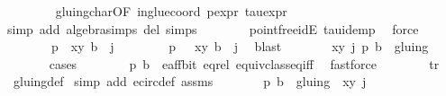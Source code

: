 \begin{isabellebody}
\ \ \ \ \ \ \isamarkupfalse%
\ gluing{\isacharunderscore}char{\isacharbrackleft}OF\ in{\isacharunderscore}glue{\isacharunderscore}coord{\isacharbrackright}\ p{\isacharunderscore}expr\ tau{\isacharunderscore}expr\ \isanewline
\ \ \ \ \ \ \isamarkupfalse%
{\isacharparenleft}simp\ add{\isacharcolon}\ algebra{\isacharunderscore}simps\ del{\isacharcolon}\ {\isasymtau}{\isachardot}simps{\isacharparenright}\isanewline
\ \ \ \ \ \ \isamarkupfalse%
\ pointfree{\isacharunderscore}idE\ tau{\isacharunderscore}idemp\ \isamarkupfalse%
\ force\isanewline
\ \ \ \ \isamarkupfalse%
\ \isamarkupfalse%
\isanewline
\ \ \ \ \ \ {\isacharparenleft}{}{\isacharparenright}\ {\isachardoublequoteopen}p\ {\isacharequal}\ {\isacharparenleft}x{\isacharcomma}y{\isacharparenright}{\isachardoublequoteclose}\ {\isachardoublequoteopen}b\ {\isacharequal}\ j{\isachardoublequoteclose}\ {\isacharbar}\isanewline
\ \ \ \ \ \ {\isacharparenleft}{}{\isacharparenright}\ {\isachardoublequoteopen}p\ {\isacharequal}\ {\isasymtau}\ {\isacharparenleft}x{\isacharcomma}y{\isacharparenright}{\isachardoublequoteclose}\ {\isachardoublequoteopen}b\ {\isacharequal}\ j{\isacharplus}{}{\isachardoublequoteclose}\ \isamarkupfalse%
\ blast\isanewline
\ \ \ \ \isamarkupfalse%
\ \isamarkupfalse%
\ {\isachardoublequoteopen}{\isacharparenleft}{\isacharparenleft}{\isacharparenleft}x{\isacharcomma}y{\isacharparenright}{\isacharcomma}\ j{\isacharparenright}{\isacharcomma}\ p{\isacharcomma}\ b{\isacharparenright}\ {\isasymin}\ gluing{\isachardoublequoteclose}\ \isanewline
\ \ \ \ \ \ \isamarkupfalse%
{\isacharparenleft}cases{\isacharparenright}\isanewline
\ \ \ \ \ \ \isamarkupfalse%
\ {\isacartoucheopen}{\isacharparenleft}p{\isacharcomma}\ b{\isacharparenright}\ {\isasymin}\ e{\isacharunderscore}aff{\isacharunderscore}bit{\isacartoucheclose}\ eq{\isacharunderscore}rel\ equiv{\isacharunderscore}class{\isacharunderscore}eq{\isacharunderscore}iff\ \isamarkupfalse%
\ fastforce\isanewline
\ \ \ \ \ \ \isamarkupfalse%
\ tr\ \isamarkupfalse%
\ gluing{\isacharunderscore}def\ \isamarkupfalse%
{\isacharparenleft}simp\ add{\isacharcolon}\ e{\isacharunderscore}circ{\isacharunderscore}def\ assms{\isacharparenright}\isanewline
\ \ \ \ \isamarkupfalse%
\ \isamarkupfalse%
\ {\isachardoublequoteopen}{\isacharparenleft}p{\isacharcomma}\ b{\isacharparenright}\ {\isasymin}\ gluing\ {\isacharbackquote}{\isacharbackquote}\ {\isacharbraceleft}{\isacharparenleft}{\isacharparenleft}x{\isacharcomma}y{\isacharparenright}{\isacharcomma}\ j{\isacharparenright}{\isacharbraceright}{\isachardoublequoteclose}\ \isamarkupfalse%

\end{isabellebody}
